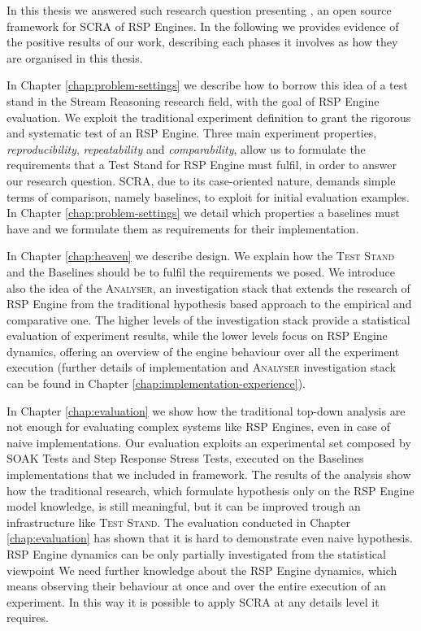 In this thesis we answered such research question presenting \name, an open source framework for SCRA of RSP Engines. In the following we provides evidence of the positive results of our work, describing each phases it involves as how they are organised in this thesis.  

In Chapter \ref{chap:problem-settings} we describe how to borrow this idea of a test stand in the Stream Reasoning research field, with the goal of RSP Engine evaluation. We exploit the traditional experiment definition to grant the rigorous and systematic test of an RSP Engine. Three main experiment properties, \textit{reproducibility}, \textit{repeatability} and \textit{comparability}, allow us to formulate the requirements that a Test Stand for RSP Engine must fulfil, in order to answer our research question. SCRA, due to its case-oriented nature, demands simple terms of comparison, namely baselines, to exploit for initial evaluation examples. In Chapter \ref{chap:problem-settings} we detail which properties a baselines must have and we formulate them as requirements for their implementation.

In Chapter \ref{chap:heaven} we describe \name design. We explain how the \textsc{Test Stand} and the Baselines should be to fulfil the requirements we posed. We introduce also the idea of the \textsc{Analyser}, an investigation stack that extends the research of RSP Engine from the traditional hypothesis based approach to the empirical and comparative one. The higher levels of the investigation stack provide a statistical evaluation of experiment results, while the lower levels focus on RSP Engine dynamics, offering an overview of the engine behaviour over all the experiment execution (further details of \name implementation and \textsc{Analyser} investigation stack can be found in Chapter \ref{chap:implementation-experience}).

In Chapter \ref{chap:evaluation} we show how the traditional top-down analysis are not enough for evaluating complex systems like RSP Engines, even in case of naive implementations. Our evaluation exploits an experimental set composed by SOAK Tests and Step Response Stress Tests, executed on the Baselines implementations that we included in \name framework. The results of the analysis show how the traditional research, which formulate hypothesis only on the RSP Engine model knowledge, is still meaningful, but it can be improved trough an infrastructure like \name \textsc{Test Stand}. The evaluation conducted in Chapter \ref{chap:evaluation} has shown that it is hard to demonstrate even naive hypothesis. RSP Engine dynamics can be only partially investigated from the statistical viewpoint We need further knowledge about the RSP Engine dynamics, which means observing their behaviour at once and over the entire execution of an experiment. In this way it is possible to apply SCRA at any details level it requires.\\

